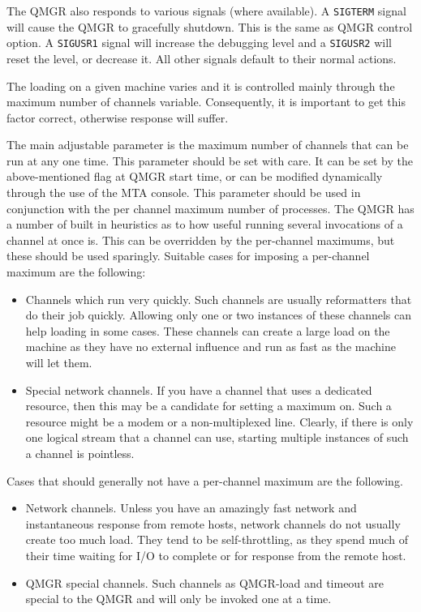The QMGR also responds to various signals (where available). A
\verb|SIGTERM| signal will cause the QMGR to gracefully
shutdown. This is the same as QMGR control option. A \verb|SIGUSR1|
signal will increase the debugging level and a \verb|SIGUSR2| will
reset the level, or decrease it. All other signals default to their
normal actions.

The loading on a given machine varies and it is controlled mainly
through the maximum number of channels variable. Consequently, it is
important to get this factor correct, otherwise response will suffer.

The main adjustable parameter is the maximum number of channels that
can be run at any one time. This parameter should be set with care. It
can be set by the above-mentioned flag at QMGR start time, or can be
modified dynamically through the use of the MTA console. This
parameter should be used in conjunction with the per channel maximum
number of processes.  The QMGR has a number of built in heuristics as
to how useful running several invocations of a channel at once is.
This can be overridden by the per-channel maximums, but these should be
used sparingly.  Suitable cases for imposing a per-channel maximum are
the following:
\begin{itemize}
\item	Channels which run very quickly. Such channels are usually
reformatters that do their job quickly. Allowing only one or two
instances of these channels can help loading in some cases. These
channels can create a large load on the machine as they have no external
influence and run as fast as the machine will let them.

\item Special network channels. If you have a channel that uses a
dedicated resource, then this may be a candidate for setting a maximum
on. Such a resource might be a modem or a non-multiplexed line.
Clearly, if there is only one logical stream that a channel can use,
starting multiple instances of such a channel is pointless.
\end{itemize}

Cases that should generally not have a per-channel maximum are the
following.
\begin{itemize}
\item	Network channels. Unless you have an amazingly fast network
and instantaneous response from remote hosts, network channels do not
usually create too much load. They tend to be self-throttling, as they
spend much of their time waiting for I/O to complete or for response
from the remote host.

\item QMGR special channels. Such channels as QMGR-load and timeout 
are special to the QMGR and will only be invoked one at a time.
\end{itemize}

